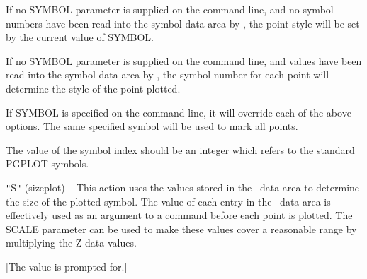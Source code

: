 \begin{sloppypar}
{{{{{               \sstitem
            If no SYMBOL parameter is supplied on the command line,
            and no symbol numbers have been read into the symbol data
            area by , the point style will be set by the current
            value of SYMBOL.

               \sstitem
            If no SYMBOL parameter is supplied on the command line,
            and values have been read into the symbol data area by
            , the symbol number for each point will determine
            the style of the point plotted.

               \sstitem
            If SYMBOL is specified on the command line, it will
            override each of the above options. The same specified
            symbol will be used to mark all points.

            }
         The value of the symbol index should be an integer which
         refers to the standard PGPLOT symbols.

            \sstitem
            {\tt "}S{\tt "} (sizeplot) -- This action uses the values stored in the
            \zcol\ data area to determine the size of the plotted symbol.
            The value of each entry in the \zcol\ data area is effectively
            used as an argument to a  command before each
            point is plotted. The SCALE parameter can be used to make
            these values cover a reasonable range by multiplying the Z
            data values.

         }
         [The value is prompted for.]
      }
      }}
\end{sloppypar}
